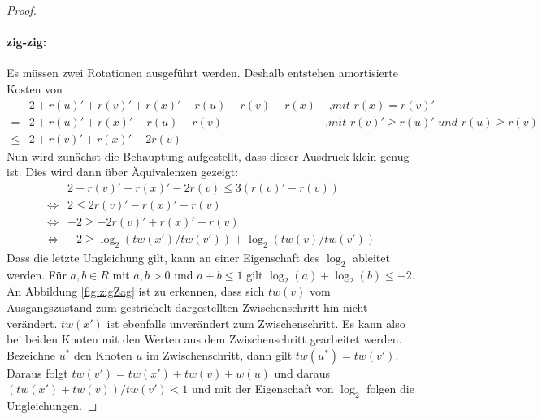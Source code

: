 \documentclass[a4paper,12pt]{article}
\begin{document}
\begin{proof}
	\paragraph{zig-zig:} 
	Es müssen zwei Rotationen ausgeführt werden. Deshalb entstehen amortisierte Kosten von
	\begin{align*}
	&2 + r\left(u\right)' +r\left(v\right)' +r\left(x\right)' - r\left(u\right)- r\left(v\right)- r\left(x\right) &\textit{ ,mit $r\left(x\right) =  r\left(v\right)'$ }\\
	=& 2 + r\left(u\right)' +r\left(x\right)' - r\left(u\right)- r\left(v\right) &\textit{,mit
		$r\left(v\right)' \geq  r\left(u\right)'$ und $r\left(u\right) \geq  r\left(v\right)$}\\
	\leq &  2 + r\left(v\right)' + r\left(x\right)' - 2 r\left(v\right) 
	\end{align*}
	Nun wird zunächst die Behauptung aufgestellt, dass dieser Ausdruck klein genug ist. Dies wird dann über Äquivalenzen gezeigt:
	\begin{align*}
	& 2 + r\left(v\right)' + r\left(x\right)' - 2 r\left(v\right) \leq  3\left(r\left(v\right)'- r\left(v\right)\right)\\
	\Leftrightarrow &2 \leq 2r\left(v\right)' -  r\left(x\right)' - r\left(v\right)\\
	\Leftrightarrow & -2 \geq -2r\left(v\right)' +  r\left(x\right)' + r\left(v\right)\\
	\Leftrightarrow & -2 \geq \log_2\left(\mathit{tw}\left(x'\right) / \mathit{tw}\left(v'\right)\right) + \log_2\left(\mathit{tw}\left(v\right) / \mathit{tw}\left(v'\right)\right)
	\end{align*}
	Dass die letzte Ungleichung gilt, kann an einer Eigenschaft des $\log_2$ ableitet werden. Für $a,b \in \mathit{R}$ mit $a,b > 0$ und $a + b \leq 1$ gilt $\log_2\left(a\right) + \log_2\left(b\right) \leq -2$. An Abbildung \ref{fig:zigZag} ist zu erkennen, dass sich $\mathit{tw}\left(v\right)$ vom Ausgangszustand zum gestrichelt dargestellten Zwischenschritt hin nicht verändert. $\mathit{tw}\left(x'\right)$ ist ebenfalls unverändert zum Zwischenschritt. Es kann also bei beiden Knoten mit den Werten aus dem Zwischenschritt gearbeitet werden. Bezeichne $u^*$ den Knoten $u$ im Zwischenschritt, dann gilt $ \mathit{tw}\left(u^*\right) = \mathit{tw}\left(v'\right)$. \\  Daraus folgt $\mathit{tw}\left(v'\right) = \mathit{tw}\left(x'\right) + \mathit{tw}\left(v\right) + w\left(u\right) $ und daraus \mbox{$\left(\mathit{tw}\left(x'\right) + \mathit{tw}\left(v\right)\right) /  \mathit{tw}\left(v'\right) < 1$} und mit der Eigenschaft von $\log_2$ folgen die Ungleichungen.
	

\end{proof}
\end{document}
